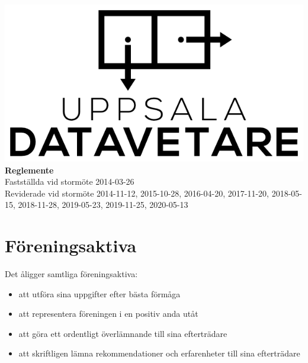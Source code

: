 \documentclass[a4paper]{article}
\begin{document}
\begin{titlepage}
  \vspace*{\fill}
  \centering
  \vfill
  \vfill
  \includegraphics[width=\textwidth]{UD_center.png}
  {\huge\textbf{Reglemente}\\
    \vspace{0.3em}
    \large{Fastställda vid stormöte 2014-03-26\\
      Reviderade vid stormöte 2014-11-12, 2015-10-28, 2016-04-20, 2017-11-20,
      2018-05-15, 2018-11-28, 2019-05-23, 2019-11-25, 2020-05-13}}
  \vfill
  \vfill
  \vspace*{\fill}
\end{titlepage}
\renewcommand{\contentsname}{Innehåll\hfill\small Sida}
\tableofcontents
\cleardoublepage 
\setcounter{page}{1}
\cfoot{\thepage}
\section{Föreningsaktiva}
{Det åligger samtliga föreningsaktiva:
  \begin{itemize}
    \item att utföra sina uppgifter efter bästa förmåga
    \item att representera föreningen i en positiv anda utåt
    \item att göra ett ordentligt överlämnande till sina efterträdare
    \item att skriftligen lämna rekommendationer och erfarenheter till sina efterträdare
  \end{itemize}}
\end{document}
